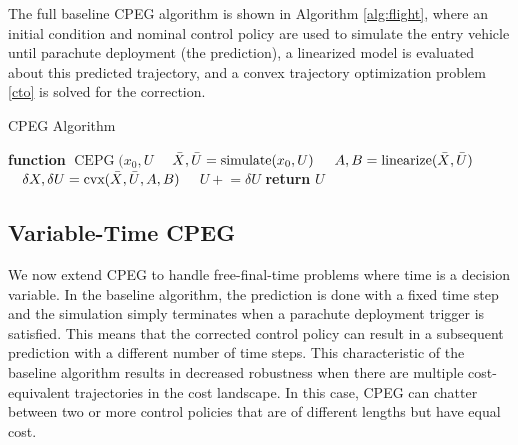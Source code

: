The full baseline CPEG algorithm is shown in Algorithm \ref{alg:flight}, where an initial condition and nominal control policy are used to simulate the entry vehicle until parachute deployment (the prediction), a linearized model is evaluated about this predicted trajectory, and a convex trajectory optimization problem \eqref{cto} is solved for the correction. 
  \begin{algorithm} [H]
	\begin{algorithmic}[1]
		\caption{CPEG Algorithm}\label{alg:flight}
		\State \textbf{function} $\operatorname{CEPG}(x_0, U$  
    		\State $\quad \Bar{X}, \Bar{U} = \text{simulate}(x_0,U)$ 
    		\State $\quad A,B = \text{linearize}(\Bar{X}, \Bar{U})$ 
    		\State $\quad \delta X,\delta U = \text{cvx}(\Bar{X}, \Bar{U}, A, B)$  
    	    \State $\quad U \mathrel{+}= \delta U $ 
		\State \textbf{return} $U$ 
	\end{algorithmic}
\end{algorithm}
\subsection{Variable-Time CPEG}
 We now extend CPEG to handle free-final-time problems where time is a decision variable. In the baseline algorithm, the prediction is done with a fixed time step and the simulation simply terminates when a parachute deployment trigger is satisfied. This means that the corrected control policy can result in a subsequent prediction with a different number of time steps. This characteristic of the baseline algorithm results in decreased robustness when there are multiple cost-equivalent trajectories in the cost landscape. In this case, CPEG can chatter between two or more control policies that are of different lengths but have equal cost. 

